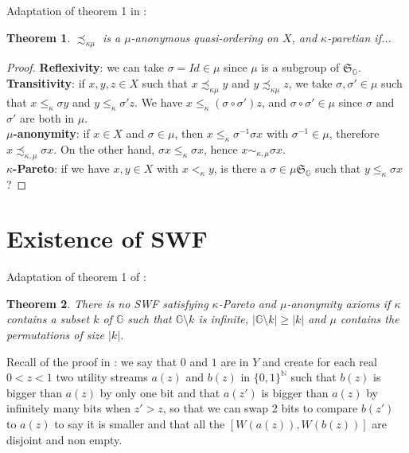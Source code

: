 \documentclass{article}
\newcommand{\G}{\mathbb{G}}
\newtheorem{theorem}{Theorem}
\begin{document}
Adaptation of theorem 1 in \cite{svensson80}:
\begin{theorem}
    $\precsim_{\kappa\mu}$ is a $\mu$-anonymous quasi-ordering on $X$, and
    $\kappa$-paretian if...
\end{theorem}
\begin{proof}
    \textbf{Reflexivity}: we can take $\sigma = Id\in\mu$ since $\mu$ is a
    subgroup of $\mathfrak{S}_\G$.\\
    \textbf{Transitivity}: if $x,y,z\in X$ such that $x \precsim_{\kappa\mu} y$ and 
    $y \precsim_{\kappa\mu} z$,
    we take $\sigma,\sigma'\in \mu$ such that $x\leq_\kappa \sigma y$ and
    $y\leq_\kappa \sigma' z$. We have $x\leq_\kappa (\sigma\circ\sigma')z$,
    and $\sigma\circ\sigma'\in\mu$ since $\sigma$ and $\sigma'$ are both in $\mu$.\\
    \textbf{$\mu$-anonymity}: if $x\in X$ and $\sigma\in\mu$, then
    $x\leq_\kappa\sigma^{-1}\sigma x$ with $\sigma^{-1}\in\mu$,
    therefore $x \precsim_{\kappa,\mu} \sigma x$. On the other hand,
    $\sigma x \leq_{\kappa}\sigma x$, hence $x \sim_{\kappa, \mu}\sigma x$.\\
    \textbf{$\kappa$-Pareto}: if we have $x,y\in X$ with $x<_\kappa y$, is there a
    $\sigma\in \mu\mathfrak{S}_\G$ such that $y\leq_\kappa \sigma x$? 
\end{proof}

\section{Existence of SWF}

Adaptation of theorem 1 of \cite{basumitra03}:
\begin{theorem}
  There is no SWF satisfying $\kappa$-Pareto and $\mu$-anonymity axioms if $\kappa$
  contains a subset $k$ of $\mathbb G$ such that $\mathbb G\setminus k$ is infinite,
  $|\mathbb G\setminus k|\geq |k|$ and $\mu$ contains the permutations of size $|k|$.
\end{theorem}

Recall of the proof in \cite{basumitra03} : we say that $0$ and $1$ are in $Y$ and
create for each real $0<z<1$ two utility streams $a(z)$ and $b(z)$ in
$\{0,1\}^{\mathbb N}$ such that $b(z)$ is bigger than $a(z)$ by only one bit and
that $a(z')$ is bigger than $a(z)$ by infinitely many bits when $z'>z$, so that we
can swap 2 bits to compare $b(z')$ to $a(z)$ to say it is smaller and that all the
$[W(a(z)),W(b(z))]$ are disjoint and non empty.
\end{document}
